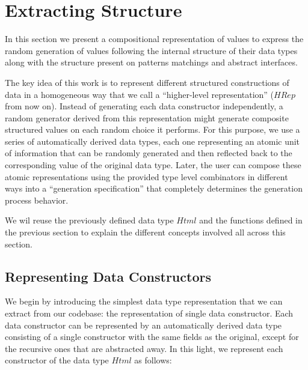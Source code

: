 \documentclass[conference, fleqn]{IEEEtran}
\newcommand{\Conid}[1]{\mathit{#1}}
\begin{document}
\newpage

\section{Extracting Structure} \label{sec:hrep}

In this section we present a compositional representation of values to express
the random generation of values following the internal structure of their data
types along with the structure present on patterns matchings and abstract
interfaces.


The key idea of this work is to represent different structured constructions of
data in a homogeneous way that we call a ``higher-level representation'' (\ensuremath{\Conid{HRep}}
from now on).
%
Instead of generating each data constructor independently, a random generator
derived from this representation might generate composite structured values on
each random choice it performs.
%
%
For this purpose, we use a series of automatically derived data types, each one
representing an atomic unit of information that can be randomly generated and
then reflected back to the corresponding value of the original data type.
%
Later, the user can compose these atomic representations using the provided type
level combinators in different ways into a ``generation specification'' that
completely determines the generation process behavior.


We wil reuse the previously defined data type \ensuremath{\Conid{Html}} and the functions defined
in the previous section to explain the different concepts involved all across
this section.


\subsection*{\textbf{Representing Data Constructors}}

We begin by introducing the simplest data type representation that we can
extract from our codebase: the representation of single data constructor.
%
Each data constructor can be represented by an automatically derived data type
consisting of a single constructor with the same fields as the original, except
for the recursive ones that are abstracted away.
%
In this light, we represent each constructor of the data type \ensuremath{\Conid{Html}} as follows:
\end{document}
